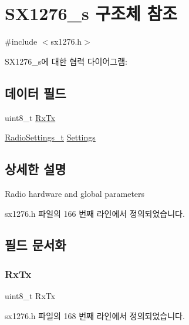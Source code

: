 \hypertarget{struct_s_x1276__s}{}\section{S\+X1276\+\_\+s 구조체 참조}
\label{struct_s_x1276__s}


{\ttfamily \#include $<$sx1276.\+h$>$}



S\+X1276\+\_\+s에 대한 협력 다이어그램\+:
\subsection*{데이터 필드}
\begin{DoxyCompactItemize}
\item 
uint8\+\_\+t \mbox{\hyperlink{struct_s_x1276__s_a8aad44e68562406bd34a92689fdf69e8}{Rx\+Tx}}
\item 
\mbox{\hyperlink{struct_radio_settings__t}{Radio\+Settings\+\_\+t}} \mbox{\hyperlink{struct_s_x1276__s_a7f3afe44d774d48ff7bd99cb074effd2}{Settings}}
\end{DoxyCompactItemize}


\subsection{상세한 설명}
Radio hardware and global parameters 

sx1276.\+h 파일의 166 번째 라인에서 정의되었습니다.



\subsection{필드 문서화}
\mbox{\label{struct_s_x1276__s_a8aad44e68562406bd34a92689fdf69e8}} 
\subsubsection{\texorpdfstring{Rx\+Tx}{RxTx}}
{\footnotesize\ttfamily uint8\+\_\+t Rx\+Tx}



sx1276.\+h 파일의 168 번째 라인에서 정의되었습니다.

\mbox{\label{struct_s_x1276__s_a7f3afe44d774d48ff7bd99cb074effd2}} 
